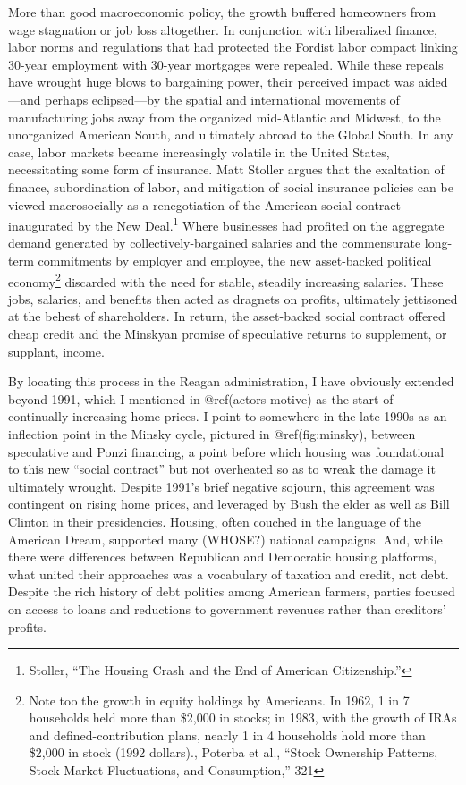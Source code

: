 \documentclass[
]{article}
\let\rmarkdownfootnote\footnote%
\def\footnote{\protect\rmarkdownfootnote}
\begin{document}
More than good macroeconomic policy, the growth buffered homeowners from
wage stagnation or job loss altogether. In conjunction with liberalized
finance, labor norms and regulations that had protected the Fordist
labor compact linking 30-year employment with 30-year mortgages were
repealed. While these repeals have wrought huge blows to bargaining
power, their perceived impact was aided---and perhaps eclipsed---by the
spatial and international movements of manufacturing jobs away from the
organized mid-Atlantic and Midwest, to the unorganized American South,
and ultimately abroad to the Global South. In any case, labor markets
became increasingly volatile in the United States, necessitating some
form of insurance. Matt Stoller argues that the exaltation of finance,
subordination of labor, and mitigation of social insurance policies can
be viewed macrosocially as a renegotiation of the American social
contract inaugurated by the New Deal.\footnote{Stoller, ``The Housing
  Crash and the End of American Citizenship.''} Where businesses had
profited on the aggregate demand generated by collectively-bargained
salaries and the commensurate long-term commitments by employer and
employee, the new asset-backed political economy\footnote{Note too the
  growth in equity holdings by Americans. In 1962, 1 in 7 households
  held more than \$2,000 in stocks; in 1983, with the growth of IRAs and
  defined-contribution plans, nearly 1 in 4 households hold more than
  \$2,000 in stock (1992 dollars)., Poterba et al., ``Stock Ownership
  Patterns, Stock Market Fluctuations, and Consumption,'' 321} discarded
with the need for stable, steadily increasing salaries. These jobs,
salaries, and benefits then acted as dragnets on profits, ultimately
jettisoned at the behest of shareholders. In return, the asset-backed
social contract offered cheap credit and the Minskyan promise of
speculative returns to supplement, or supplant, income.

By locating this process in the Reagan administration, I have obviously
extended beyond 1991, which I mentioned in @ref(actors-motive) as the
start of continually-increasing home prices. I point to somewhere in the
late 1990s as an inflection point in the Minsky cycle, pictured in
@ref(fig:minsky), between speculative and Ponzi financing, a point
before which housing was foundational to this new ``social contract''
but not overheated so as to wreak the damage it ultimately wrought.
Despite 1991's brief negative sojourn, this agreement was contingent on
rising home prices, and leveraged by Bush the elder as well as Bill
Clinton in their presidencies. Housing, often couched in the language of
the American Dream, supported many (WHOSE?) national campaigns. And,
while there were differences between Republican and Democratic housing
platforms, what united their approaches was a vocabulary of taxation and
credit, not debt. Despite the rich history of debt politics among
American farmers, parties focused on access to loans and reductions to
government revenues rather than creditors' profits.
\end{document}
